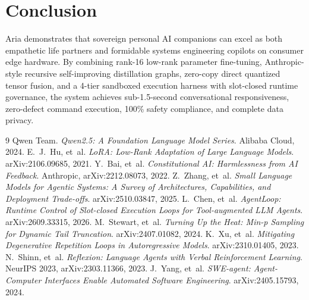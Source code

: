 \documentclass[10pt,a4paper]{article}
\begin{document}
\section{Conclusion}

Aria demonstrates that sovereign personal AI companions can excel as both empathetic life partners and formidable systems engineering copilots on consumer edge hardware. By combining rank-16 low-rank parameter fine-tuning, Anthropic-style recursive self-improving distillation graphs, zero-copy direct quantized tensor fusion, and a 4-tier sandboxed execution harness with slot-closed runtime governance, the system achieves sub-1.5-second conversational responsiveness, zero-defect command execution, 100\% safety compliance, and complete data privacy.

\begin{thebibliography}{9}
\small
{}
Qwen Team. \textit{Qwen2.5: A Foundation Language Model Series}. Alibaba Cloud, 2024.
E.~J.~Hu, et~al. \textit{LoRA: Low-Rank Adaptation of Large Language Models}. arXiv:2106.09685, 2021.
Y.~Bai, et~al. \textit{Constitutional AI: Harmlessness from AI Feedback}. Anthropic, arXiv:2212.08073, 2022.
Z.~Zhang, et~al. \textit{Small Language Models for Agentic Systems: A Survey of Architectures, Capabilities, and Deployment Trade-offs}. arXiv:2510.03847, 2025.
L.~Chen, et~al. \textit{AgentLoop: Runtime Control of Slot-closed Execution Loops for Tool-augmented LLM Agents}. arXiv:2609.33315, 2026.
M.~Stewart, et~al. \textit{Turning Up the Heat: Min-p Sampling for Dynamic Tail Truncation}. arXiv:2407.01082, 2024.
K.~Xu, et~al. \textit{Mitigating Degenerative Repetition Loops in Autoregressive Models}. arXiv:2310.01405, 2023.
N.~Shinn, et~al. \textit{Reflexion: Language Agents with Verbal Reinforcement Learning}. NeurIPS 2023, arXiv:2303.11366, 2023.
J.~Yang, et~al. \textit{SWE-agent: Agent-Computer Interfaces Enable Automated Software Engineering}. arXiv:2405.15793, 2024.
\end{thebibliography}
\end{document}
